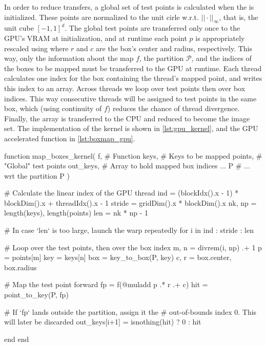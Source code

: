 In order to reduce transfers, a global set of test points is calculated when the 
 is initialized. These points are normalized to the unit cirle w.r.t. 
$|| \cdot ||_\infty$, that is, the unit cube $[-1,1]^d$. The global test points are 
transferred only once to the GPU's VRAM at initialization, and at runtime each point $p$ 
is appropriately rescaled using  where $r$ and $c$ are the 
box's center and radius, respectively. This way, only the information about the 
map $f$, the partition $\mathcal{P}$, and the indices of the boxes to be mapped must be 
transferred to the GPU at runtime. Each thread calculates one index for the box containing 
the thread's mapped point, and writes this index to an array. 
Across threads we loop over test points then over box indices. This way consecutive 
threads will be assigned to test points in the same box, which (using continuity of $f$) 
reduces the chance of thread divergence. Finally, the array is 
transferred to the CPU and reduced to become the image set. The implementation of the 
kernel is shown in \autoref{lst:gpu_kernel}, and the GPU accelerated 
function in \autoref{lst:boxmap_gpu}. \\

\begin{jllisting}[float, floatplacement=ht!, language=julia, style=jlcodestyle, label=lst:gpu_kernel, captionpos=b, caption=GPU kernel to calculate $f(\mathcal{B})$]
    function map_boxes_kernel(
            f,          # Function
            keys,       # Keys to be mapped
            points,     # "Global" test points
            out_keys,   # Array to hold mapped box indices ...
            P           # ... wrt the partition P
        )

        # Calculate the linear index of the GPU thread
        ind = (blockIdx().x - 1) * blockDim().x + threadIdx().x - 1
        stride = gridDim().x * blockDim().x
        nk, np = length(keys), length(points)
        len = nk * np - 1

        # In case `len` is too large, launch the warp repeatedly
        for i in ind : stride : len
        
            # Loop over the test points, then over the box index
            m, n = divrem(i, np) .+ 1
            p    = points[m]
            key  = keys[n]
            box  = key_to_box(P, key)
            c, r = box.center, box.radius

            # Map the test point forward
            fp   = f(@muladd p .* r .+ c)
            hit  = point_to_key(P, fp)

            # If `fp` lands outside the partition, assign it the
            # out-of-bounds index 0. This will later be discarded
            out_keys[i+1] = isnothing(hit) ? 0 : hit

        end
    end
\end{jllisting}

